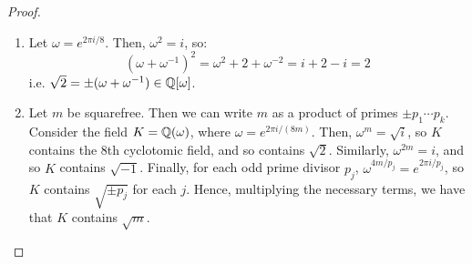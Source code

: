 \begin{proof}
\begin{enumerate}
\rule[2ex]{\textwidth}{1pt}

``Better'' proof: We've shown that $\disc(\omega) = p^{p-2}$ if $p \equiv 1 \pmod{4}$ and $\disc(\omega) = -p^{p-2}$ otherwise. But we can write $\disc(\omega) = |\sigma_i(\omega^j)|^2$, where $|\cdot|$ denotes the determinant, and $i,j$ range over the appropriate indices. Thus, $\pm p^{p-2}$ is a square of an element in $\QQ[\omega]$, and since $p$ is odd, so is $p^{p-3}$. Hence, the quotient is a square in $\QQ[\omega]$, namely $\sqrt{\pm p} \in \QQ[\omega]$. \\

Now, we consider the explicit cases. Note that the ``worse'' proof actually helps here, since it was very explicit. For $p=3$, the proof showed that
\[ \sqrt{-3} = \omega-\omega^2 = \omega-\omega^{-1} \]
which is also clear since $\omega^{\pm 1} = -\frac12 \pm i\frac{\sqrt{3}}2$. For $p=5$, the proof showed:
\[ \sqrt{5} = \omega-\omega^2-\omega^3+\omega^4 \]
To confirm this, we can square the expression:
\[ (\omega-\omega^2-\omega^3+\omega^4)^2 = \omega^2-2\omega^3-\omega^4+4\omega^5-\omega^6-2\omega^7+\omega^8 = 4-\omega-\omega^2-\omega^3-\omega^4 = 5 \]
as claimed.

\item Let $\omega = e^{2\pi i/8}$. Then, $\omega^2 = i$, so:
\[ (\omega+\omega^{-1})^2 = \omega^2+2+\omega^{-2} = i+2-i = 2 \]
i.e. $\sqrt{2} = \pm(\omega+\omega^{-1}) \in \mathbb{Q}[\omega]$.

\item Let $m$ be squarefree. Then we can write $m$ as a product of primes $\pm p_1 \cdots p_k$. Consider the field $K = \mathbb{Q}(\omega)$, where $\omega = e^{2\pi i/(8m)}$. Then, $\omega^m = \sqrt{i}$, so $K$ contains the 8th cyclotomic field, and so contains $\sqrt{2}$. Similarly, $\omega^{2m} = i$, and so $K$ contains $\sqrt{-1}$. Finally, for each odd prime divisor $p_j$, $\omega^{4m/p_j} = e^{2\pi i/p_j}$, so $K$ contains $\sqrt{\pm p_j}$ for each $j$. Hence, multiplying the necessary terms, we have that $K$ contains $\sqrt{m}$. \qedhere
\end{enumerate}
\end{proof}